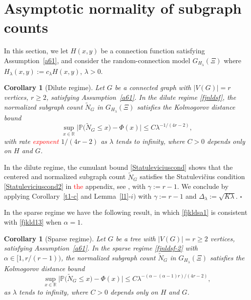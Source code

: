 \documentclass[12pt]{article}
\newtheorem{corollary}[prop]{Corollary}
\def\real{{\mathord{\mathbb R}}}
\def\P{\mathbb{P}}
\newenvironment{Proof}{\removelastskip\par\medskip
\noindent{\em Proof.} \rm}{\penalty-20\null\hfill$\square$\par\medbreak}
\numberwithin{equation}{section}
\begin{document}
\section{Asymptotic normality of subgraph counts}
\label{s6-1}
\noindent
 In this section, we let $H(x,y)$ be a connection function  
  satisfying Assumption~\ref{a61},
  and consider the
  random-connection model $G_{H_\lambda} (\Xi)$
  where $H_\lambda(x,y):= c_\lambda H(x,y)$,
  $\lambda >0$.
\begin{corollary}[Dilute regime]
  \label{c01}
  Let $G$ be a connected graph with $|V(G)|=r$ vertices, $r\geq 2$,
  satisfying Assumption~\ref{a61}. 
  In the dilute regime \eqref{fjnldsf},
  the normalized subgraph count $\widetilde{N}_G$ in 
  $G_{H_\lambda} (\Xi)$ satisfies
  the Kolmogorov distance bound %
\begin{equation}
  \label{fjkld13}
  \sup_{x\in \real}
\big| \P \big( \widetilde{N}_G \leq x \big) - \Phi(x) \big| \leq
C \lambda^{ - 1/(4r - 2)},
\end{equation}
 with rate \textcolor{red}{exponent} $1/(4r -2)$ as $\lambda$ tends to infinity, where $C>0$ depends only on $H$ and $G$.
\end{corollary}
\begin{Proof}
   In the dilute regime, the cumulant bound 
 \eqref{Statuleviciuscond} 
 shows that
 the centered and normalized subgraph count
 $\widetilde{N}_G$ 
 satisfies the {Statulevi\v{c}ius condition}
 \eqref{Statuleviciuscond2} in \textcolor{red}{the} appendix, see \cite{rudzkis,doering},
 with $\gamma := r-1$. 
 We conclude by applying Corollary~\ref{t1-c}
 and Lemma~\ref{l1}-$i)$ with $\gamma :=r-1$
 and $\Delta_\lambda:=\sqrt{K \lambda}$. 
\end{Proof}
In the sparse regime we have the following result, 
 in which \eqref{fjkldsa1} is consistent with
 \eqref{fjkld13} when $\alpha = 1$.
\begin{corollary}[Sparse regime]
  \label{c01-2}
  Let $G$ be a tree with $|V(G)| = r \geq 2$ vertices,
  satisfying Assumption~\ref{a61}. 
  In the sparse regime \eqref{fjnldsf-2}
  with $\alpha \in [1, r/(r-1) )$,
  the normalized subgraph count $\widetilde{N}_G$ in 
  $G_{H_\lambda} (\Xi)$ satisfies
  the Kolmogorov distance bound %
\begin{equation}
\label{fjkldsa1} 
\sup_{x\in \real}
\big| \P \big( \widetilde{N}_G \leq x \big) - \Phi(x) \big| \leq
C \lambda^{ - (
 \alpha   -(\alpha - 1)r 
    ) / ( 4r - 2) }, 
\end{equation} 
 as $\lambda$ tends to infinity, where $C>0$ depends only on $H$ and $G$.
\end{corollary}
\end{document}
